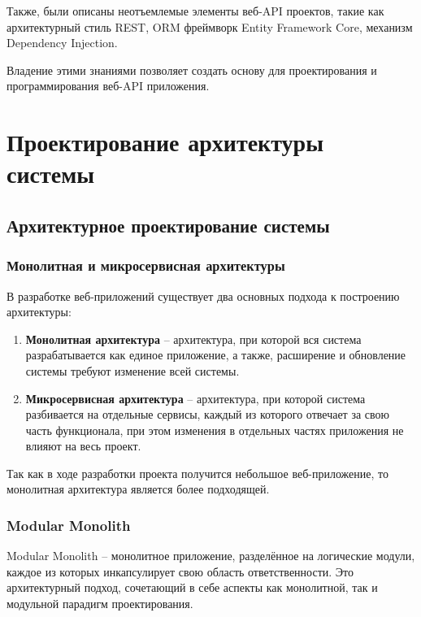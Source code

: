 \documentclass[a4paper,12pt]{report}
\begin{document}
Также, были описаны неотъемлемые элементы веб-\acs{API} проектов, такие как архитектурный стиль \acs{REST}, \acs{ORM} фреймворк Entity Framework Core, 
механизм Dependency Injection.

Владение этими знаниями позволяет создать основу для проектирования и программирования веб-\acs{API} приложения.

\chapter{Проектирование архитектуры системы}\label{architecture_chapter_title}

\section{Архитектурное проектирование системы}

\subsection{Монолитная и микросервисная архитектуры}

В разработке веб-приложений существует два основных подхода к построению архитектуры:
\begin{enumerate}
    \item
        \textbf{Монолитная архитектура} -- архитектура, при которой вся система разрабатывается как единое приложение, 
        а также, расширение и обновление системы требуют изменение всей системы.
    \item
        \textbf{Микросервисная архитектура} -- архитектура, при которой система разбивается на отдельные сервисы, 
        каждый из которого отвечает за свою часть функционала, при этом изменения в отдельных частях приложения не влияют на весь проект.\cite{application_architecture}
\end{enumerate}

Так как в ходе разработки проекта получится небольшое веб-приложение, то монолитная архитектура является более подходящей.

\subsection{Modular Monolith}

Modular Monolith -- монолитное приложение, разделённое на логические модули, каждое из которых инкапсулирует свою область ответственности.
Это архитектурный подход, сочетающий в себе аспекты как монолитной, так и модульной парадигм проектирования.\cite{modular_monolith}
\end{document}
